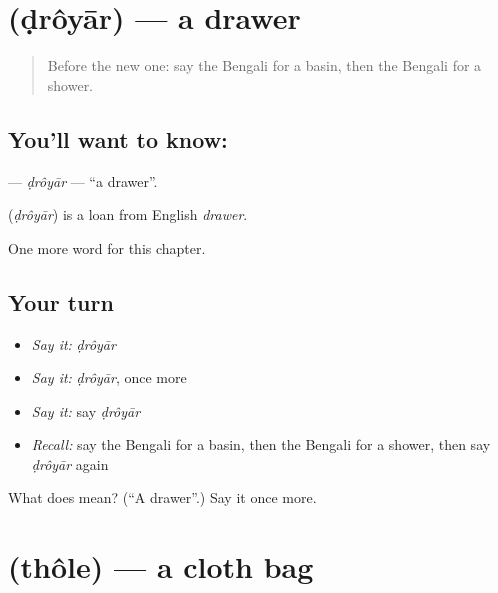 \section[\texorpdfstring{\bn{ড্রয়ার} (ḍrôyār)}{ড্রয়ার (ḍrôyār)}]{ (ḍrôyār) — a drawer}

\label{lesson:BN-C201-droyar}



\begin{quote}
Before the new one: say the Bengali for a basin, then the Bengali for a shower.
\end{quote}

\subsection*{You'll want to know: }
\textbf{} — \emph{ḍrôyār} — \textquotedblleft{}a drawer\textquotedblright{}.

\begin{cousinweb}
\textbf{} (\emph{ḍrôyār}) is a loan from English \emph{drawer}.
\end{cousinweb}

\begin{grammarlens}[title={What you've built}]
One more word for this chapter.
\end{grammarlens}

\subsection*{Your turn}
\begin{itemize}
\raggedright
  \item \emph{Say it:} \emph{ḍrôyār}
  \item \emph{Say it:} \emph{ḍrôyār}, once more
  \item \emph{Say it:} say \emph{ḍrôyār}
  \item \emph{Recall:} say the Bengali for a basin, then the Bengali for a shower, then say \emph{ḍrôyār} again
\end{itemize}

\begin{tcolorbox}[breakable,colback=teal!4,colframe=teal!35!black,title={Before you move on}]
What does  mean? (\textquotedblleft{}A drawer\textquotedblright{}.) Say it once more.
\end{tcolorbox}
\section[\texorpdfstring{\bn{থলে} (thôle)}{থলে (thôle)}]{ (thôle) — a cloth bag}

